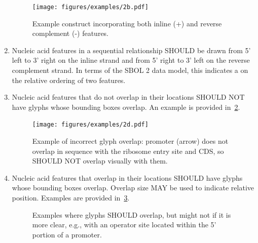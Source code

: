 \begin{enumerate}
	\begin{figure}[h!]
	\centering
	\texttt{[image: figures/examples/2b.pdf]}
	\caption{Example construct incorporating both inline (+) and reverse complement (-) features.}
	\label{exa:2b}
	\end{figure} 

\item Nucleic acid features in a sequential relationship SHOULD be drawn from 5' left to 3' right on the inline strand and from 5' right to 3' left on the reverse complement strand.
	In terms of the SBOL 2 data model, this indicates a  on the relative ordering of two features.

\item Nucleic acid features that do not overlap in their locations SHOULD NOT have glyphs whose bounding boxes overlap.
	An example is provided in~\ref{exa:2d}.
	\begin{figure}[h!]
	\centering
	\texttt{[image: figures/examples/2d.pdf]}
	\caption{Example of incorrect glyph overlap: promoter (arrow) does not overlap in sequence with the ribosome entry site and CDS, so SHOULD NOT overlap visually with them.}
	\label{exa:2d}
	\end{figure}

\item Nucleic acid features that overlap in their locations SHOULD have glyphs whose bounding boxes overlap.  Overlap size MAY be used to indicate relative position.
	Examples are provided in~\ref{exa:2e}.

	\begin{figure}[h!]
	\centering
	\caption{Examples where glyphs SHOULD overlap, but might not if it is more clear, e.g., with an operator site located within the 5' portion of a promoter.}
	\label{exa:2e}
	\end{figure}


\end{enumerate}
